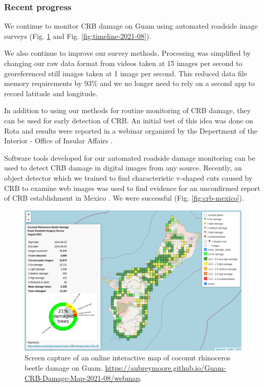 \documentclass[12pt,letterpaper,english,bibliography=totocnumbered, abstract=on]{scrartcl}
\begin{document}
\clearpage

\subsubsection{Recent progress}

We continue to monitor CRB damage on Guam using automated roadside image surveys (Fig. \ref{fig:webmap-2021-08} and Fig. \ref{fig:timeline-2021-08}).

We also continue to improve our survey methods. Processing was simplified by changing our raw data format from videos taken at 15 images per second to georeferenced still images taken at 1 image per second. This reduced data file memory requirements by 93\% and we no longer need to rely on a second app to record latitude and longitude.

In addition to using our methods for routine monitoring of CRB damage, they can be used for early detection of CRB. An initial test of this idea was done on Rota and results were reported in a webinar organized by the Depertment of the Interior - Office of Insular Affairs  \cite{usdepartmentoftheinterior-officeofinsularaffairsYouTubeVideoCoconut2021}.

Software tools developed for our automated roadside damage monitoring can be used to detect CRB damage in digital images from any source. Recently, an object detector which we trained to find characteristic v-shaped cuts caused by CRB to examine web images was used to find evidence for an unconfirmed report of CRB establishment in Mexico \cite{jacksonSocialMediaPosts2022}. We were successful (Fig.  \ref{fig:crb-mexico}).

%
%
%

\begin{figure}[H]
	\centering
	\includegraphics[width=\linewidth]{images/webmap-2021-08}
	\caption{Screen capture of an online interactive map of coconut rhinoceros beetle damage on Guam. \url{https://aubreymoore.github.io/Guam-CRB-Damage-Map-2021-08/webmap}.}
	\label{fig:webmap-2021-08}
\end{figure}
\end{document}
